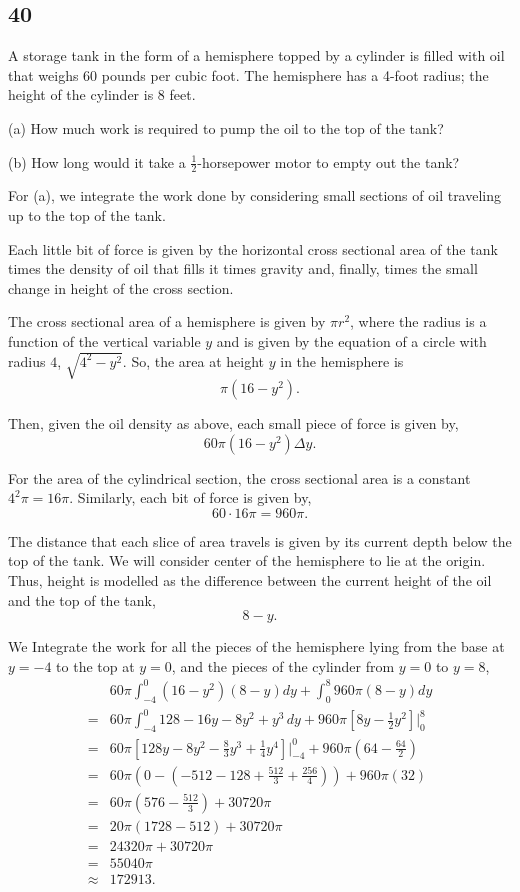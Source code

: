 \documentclass[../hw7.tex]{subfiles}
\begin{document}
\subsection*{40}
A storage tank in the form of a hemisphere topped by a cylinder is filled with oil that weighs 60 pounds per cubic foot. The hemisphere has a 4-foot radius; the height of the cylinder is 8 feet.

(a) How much work is required to pump the oil to the top of the tank?

(b) How long would it take a $\frac{1}{2}$-horsepower motor to empty
out the tank?

For (a), we integrate the work done by considering small sections of oil traveling up to the top of the tank.

Each little bit of force is given by the horizontal cross sectional area of the tank times the density of oil that fills it times gravity and, finally, times the small change in height of the cross section.

The cross sectional area of a hemisphere is given by $\pi r^2$, where the radius is a function of the vertical variable $y$ and is given by the equation of a circle with radius $4$, $\sqrt{4^2-y^2}$.
So, the area at height $y$ in the hemisphere is \[\pi\left(16-y^2\right).\]

Then, given the oil density as above, each small piece of force is given by, \[60\pi \left( 16-y^2 \right) \Delta y.\]

For the area of the cylindrical section, the cross sectional area is a constant $4^2\pi=16\pi$. Similarly, each bit of force is given by, \[60\cdot16\pi=960\pi.\]

The distance that each slice of area travels is given by its current depth below the top of the tank. We will consider center of the hemisphere to lie at the origin. Thus, height is modelled as the difference between the current height of the oil and the top of the tank, \[8-y.\]

We Integrate the work for all the pieces of the hemisphere lying from the base at $y=-4$ to the top at $y=0$, and the pieces of the cylinder from $y=0$ to $y=8$,
\begin{align*}
    & 60\pi\int_{-4}^{0} \left( 16-y^2 \right)(8-y)dy + \int_{0}^{8} 960\pi(8-y)dy \\
    =& 60\pi\int_{-4}^{0} 128-16y-8y^2+y^3\,dy + 960\pi\left[ 8y-\frac{1}{2}y^2 \right] \Bigg\vert_{0}^{8} \\
    =& 60\pi\left[ 128y-8y^2-\frac{8}{3}y^3+\frac{1}{4}y^4 \right] \Bigg\vert_{-4}^{0} + 960\pi\left( 64-\frac{64}{2} \right) \\
    =& 60\pi\left( 0-\left( -512-128+\frac{512}{3}+\frac{256}{4} \right) \right) +960\pi(32) \\
    =& 60\pi\left( 576 - \frac{512}{3} \right) + 30720\pi \\
    =& 20\pi(1728 - 512) + 30720\pi\\
    =& 24320\pi + 30720\pi \\
    =& 55040\pi \\
    \approx& 172913. \\
\end{align*}
\end{document}
